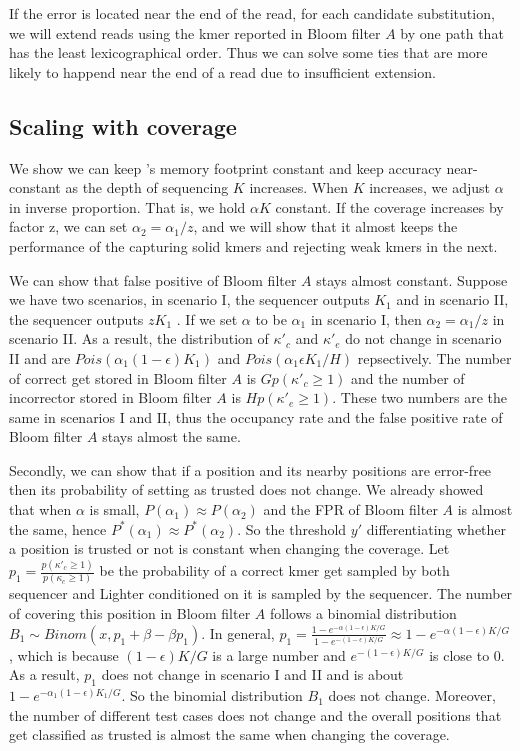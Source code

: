 \documentclass[10pt]{article}
\begin{document}
If the error is located near the end of the read, for each candidate substitution, we will extend reads using the kmer reported in Bloom filter $A$ by one path that has the least lexicographical order. Thus we can solve some ties that are more likely to happend near the end of a read due to insufficient extension. 

\subsection*{Scaling with coverage}
We show we can keep \tool's memory footprint constant and keep accuracy near-constant as the depth of sequencing $K$ increases.  When $K$ increases, we adjust $\alpha$ in inverse proportion.  That is, we hold $\alpha K$ constant.  If the coverage increases by factor z, we can set $\alpha_2=\alpha_1/z$, and we will show that it almost keeps the performance of the capturing solid kmers and rejecting weak kmers in the next.

We can show that false positive of Bloom filter $A$ stays almost constant. Suppose we have two scenarios, in scenario I, the sequencer outputs $K_1$ \kmers and in scenario II, the sequencer outputs $zK_1$ \kmers. If we set $\alpha$ to be $\alpha_1$ in scenario I, then $\alpha_2=\alpha_1/z$ in scenario II. As a result, the distribution of $\kappa'_c$ and $\kappa'_e$ do not change in scenario II and are $Pois(\alpha_1(1-\epsilon)K_1)$ and $Pois(\alpha_1\epsilon K_1 / H)$ repsectively. The number of correct \kmer get stored in Bloom filter $A$ is $Gp(\kappa'_c\ge 1)$ and the number of incorrector \kmer stored in Bloom filter $A$ is $Hp(\kappa'_e\ge 1)$. These two numbers are the same in scenarios I and II, thus the occupancy rate and the false positive rate of Bloom filter $A$ stays almost the same.

Secondly, we can show that if a position and its nearby positions are error-free then its probability of setting as trusted does not change. We already showed that when $\alpha$ is small, $P(\alpha_1)\approx P(\alpha_2)$ and the FPR of Bloom filter $A$ is almost the same, hence $P^*(\alpha_1)\approx P^*(\alpha_2)$. So the threshold $y'$ differentiating whether a position is trusted or not is constant when changing the coverage. Let $p_1=\frac{p(\kappa'_c\ge 1)}{p(\kappa_c\ge 1)}$ be the probability of a correct kmer get sampled by both sequencer and Lighter conditioned on it is sampled by the sequencer. The number of \kmers covering this position in Bloom filter $A$ follows a binomial distribution $B_1\sim Binom(x, p_1+\beta-\beta p_1)$. In general, $p_1=\frac{1-e^{-\alpha(1-\epsilon) K/G}}{1-e^{-(1-\epsilon) K/G}}\approx 1-e^{-\alpha(1-\epsilon)K/G}$, which is because $(1-\epsilon)K/G$ is a large number and $e^{-(1-\epsilon)K/G}$ is close to 0. As a result, $p_1$ does not change in scenario I and II and is about $1-e^{-\alpha_1(1-\epsilon)K_1/G}$. So the binomial distribution $B_1$ does not change. Moreover, the number of different test cases does not change and the overall positions that get classified as trusted is almost the same when changing the coverage.
 
\end{document}
